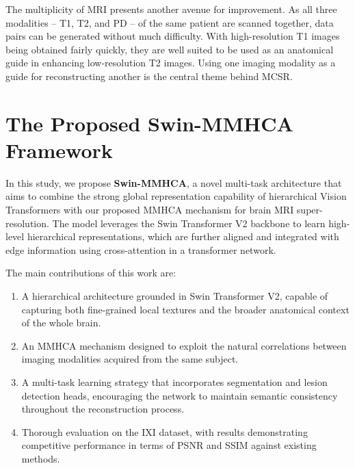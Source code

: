 The multiplicity of MRI presents another avenue for improvement. As all three modalities – T1, T2, and PD – of the same patient are scanned together, data pairs can be generated without much difficulty. With high-resolution T1 images being obtained fairly quickly, they are well suited to be used as an anatomical guide in enhancing low-resolution T2 images. Using one imaging modality as a guide for reconstructing another is the central theme behind MCSR.

\section{The Proposed Swin-MMHCA Framework}
In this study, we propose \textbf{Swin-MMHCA}, a novel multi-task architecture that aims to combine the strong global representation capability of hierarchical Vision Transformers with our proposed MMHCA mechanism for brain MRI super-resolution. The model leverages the Swin Transformer V2 backbone to learn high-level hierarchical representations, which are further aligned and integrated with edge information using cross-attention in a transformer network.

The main contributions of this work are:
\begin{enumerate}
    \item A hierarchical architecture grounded in Swin Transformer V2, capable of capturing both fine-grained local textures and the broader anatomical context of the whole brain.
    \item An MMHCA mechanism designed to exploit the natural correlations between imaging modalities acquired from the same subject.
    \item A multi-task learning strategy that incorporates segmentation and lesion detection heads, encouraging the network to maintain semantic consistency throughout the reconstruction process.
    \item Thorough evaluation on the IXI dataset, with results demonstrating competitive performance in terms of PSNR and SSIM against existing methods.
\end{enumerate}

